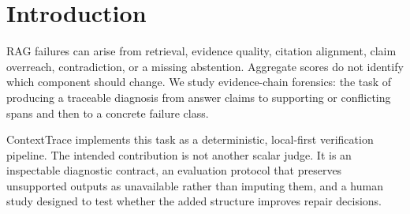 \section{Introduction}
RAG failures can arise from retrieval, evidence quality, citation alignment,
claim overreach, contradiction, or a missing abstention. Aggregate scores do
not identify which component should change. We study evidence-chain forensics:
the task of producing a traceable diagnosis from answer claims to supporting
or conflicting spans and then to a concrete failure class.

ContextTrace implements this task as a deterministic, local-first verification
pipeline. The intended contribution is not another scalar judge. It is an
inspectable diagnostic contract, an evaluation protocol that preserves
unsupported outputs as unavailable rather than imputing them, and a human
study designed to test whether the added structure improves repair decisions.
